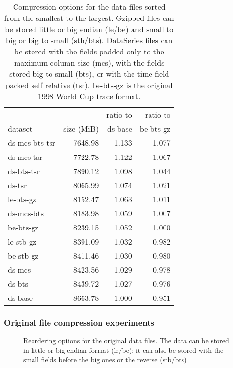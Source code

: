 \begin{table}
\centering
\begin{tabular}{|l|r|r|r|}\hline

               &            & ratio to & ratio to  \\
    dataset    & size (MiB) & ds-base  & be-bts-gz \\
\hline
ds-mcs-bts-tsr & 7648.98    & 1.133    & 1.077     \\
ds-mcs-tsr     & 7722.78    & 1.122    & 1.067     \\
ds-bts-tsr     & 7890.12    & 1.098    & 1.044     \\
ds-tsr         & 8065.99    & 1.074    & 1.021     \\
le-bts-gz      & 8152.47    & 1.063    & 1.011     \\
ds-mcs-bts     & 8183.98    & 1.059    & 1.007     \\
be-bts-gz      & 8239.15    & 1.052    & 1.000     \\
le-stb-gz      & 8391.09    & 1.032    & 0.982     \\
be-stb-gz      & 8411.46    & 1.030    & 0.980     \\
ds-mcs         & 8423.56    & 1.029    & 0.978     \\
ds-bts         & 8439.72    & 1.027    & 0.976     \\
ds-base        & 8663.78    & 1.000    & 0.951     \\
\hline
\end{tabular}


\caption{Compression options for the data files sorted from the smallest
to the largest.  Gzipped files can be stored little or big endian
(le/be) and small to big or big to small (stb/bts).  DataSeries files
can be stored with the fields padded only to the maximum column size
(mcs), with the fields stored big to small (bts), or with the time
field packed self relative (tsr). be-bts-gz is the original 1998 World
Cup trace format.}

\label{table:wc1998:compression}
\end{table}

\subsubsection{Original file compression experiments}

\begin{figure}
\caption{Reordering options for the original data files.
The data can be stored in little or big endian format (le/be); it can
also be stored with the small fields before the big ones or the
reverse (stb/bts)}
\label{fig:wc1998:original-data-reordering}
\end{figure}

